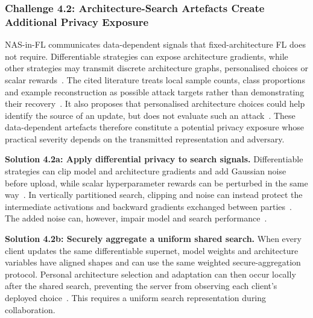 \subsubsection{Challenge 4.2: Architecture-Search Artefacts Create Additional Privacy Exposure}

NAS-in-FL communicates data-dependent signals that fixed-architecture FL does not require. Differentiable strategies can expose architecture gradients, while other strategies may transmit discrete architecture graphs, personalised choices or scalar rewards~\cite{dp-fnas_2020,multi-granular_fednas_2023,privacy_preserving_fednas_for_edge_2025,feathers_2023}. The cited literature treats local sample counts, class proportions and example reconstruction as possible attack targets rather than demonstrating their recovery~\cite{multi-granular_fednas_2023}. It also proposes that personalised architecture choices could help identify the source of an update, but does not evaluate such an attack~\cite{privacy_preserving_fednas_for_edge_2025}. These data-dependent artefacts therefore constitute a potential privacy exposure whose practical severity depends on the transmitted representation and adversary.

\noindent\textbf{Solution 4.2a: Apply differential privacy to search signals.} Differentiable strategies can clip model and architecture gradients and add Gaussian noise before upload, while scalar hyperparameter rewards can be perturbed in the same way~\cite{dp-fnas_2020,feathers_2023}. In vertically partitioned search, clipping and noise can instead protect the intermediate activations and backward gradients exchanged between parties~\cite{self-supervised_vertical_fednas_2023}. The added noise can, however, impair model and search performance~\cite{privacy_preserving_fednas_for_edge_2025}.

\noindent\textbf{Solution 4.2b: Securely aggregate a uniform shared search.} When every client updates the same differentiable supernet, model weights and architecture variables have aligned shapes and can use the same weighted secure-aggregation protocol. Personal architecture selection and adaptation can then occur locally after the shared search, preventing the server from observing each client's deployed choice~\cite{privacy_preserving_fednas_for_edge_2025}. This requires a uniform search representation during collaboration.

